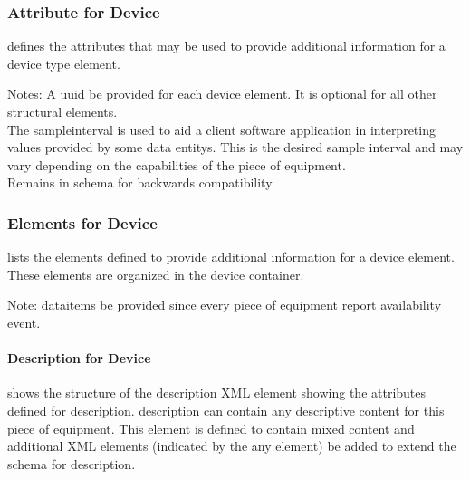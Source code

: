 \FloatBarrier

\subsubsection{Attribute for Device}

 defines the attributes that may be used to provide additional information for a \gls{device} type element.




\begin{note}
Notes: \notesign A \gls{uuid} \MUST be provided for each \gls{device} element.  It is optional for all other \glspl{structural element}.\\ \notesign \notesign The \gls{sampleinterval} is used to aid a client software application in interpreting values provided by some \glspl{data entity}.  This is the desired sample interval and may vary depending on the capabilities of the piece of equipment.\\\notesign \notesign \notesign Remains in schema for backwards compatibility.

\end{note}

\subsubsection{Elements for Device}
 lists the elements defined to provide additional information for a \gls{device} element. These elements are organized in the \gls{device} container.



\begin{note}
    Note: \notesign \gls{dataitems} \MUST be provided since every piece of equipment \MUST report \gls{availability event}.

\end{note}


\paragraph{Description for Device}\mbox{}

 shows the structure of the \gls{description} XML element showing the attributes defined for \gls{description}.  \gls{description} can contain any descriptive content for this piece of equipment.  This element is defined to contain mixed content and additional XML elements (indicated by the \gls{any} element) \may be added to extend the schema for \gls{description}.

